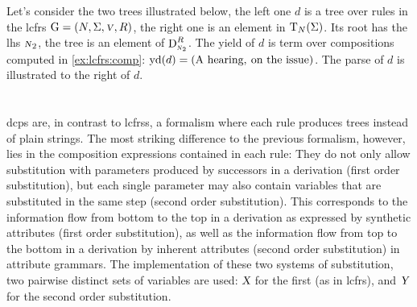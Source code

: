 \documentclass[../document.tex]{subfiles}
\begin{document}
    \begin{example}\label{ex:lcfrs:deriv}
        Let's consider the two trees illustrated below, the left one \(d\) is a tree over rules in the \gls*{lcfrs} \(\mathrm{G} = (N, \Sigma, \textsc{\textsl{v}}, R)\), the right one is an element in \(\operatorname{T}_N(\Sigma)\).
        Its root has the \gls*{lhs} \(\textsc{\textsl{n}}_2\), the tree is an element of \(\operatorname{D}^R_{\textsc{\textsl{n}}_2}\).
        The yield of \(d\) is term over compositions computed in \cref{ex:lcfrs:comp}: \(\operatorname{yd}(d) = (\text{A hearing}, \: \text{on the issue})\).
        The parse of \(d\) is illustrated to the right of \(d\).

        \null\hfill
        \hfill
        \hfill\null
    \end{example}


    \section{}
    \Glspl{dcp} are, in contrast to \glspl{lcfrs}, a formalism where each rule produces trees instead of plain strings.
    The most striking difference to the previous formalism, however, lies in the composition expressions contained in each rule:
        They do not only allow substitution with parameters produced by successors in a derivation (first order substitution), but each single parameter may also contain variables that are substituted in the same step (second order substitution).
    This corresponds to the information flow from bottom to the top in a derivation as expressed by synthetic attributes (first order substitution), as well as the information flow from top to the bottom in a derivation by inherent attributes (second order substitution) in attribute grammars.
    The implementation of these two systems of substitution, two pairwise distinct sets of variables are used: \(\textsl{X}\) for the first (as in \gls{lcfrs}), and \(\textsl{Y}\) for the second order substitution.
\end{document}
